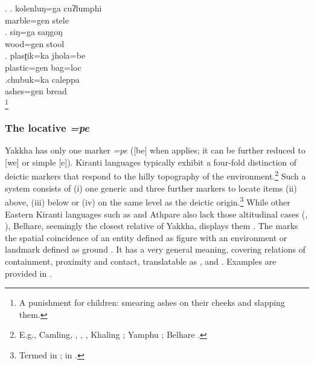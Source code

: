 \ex. \ag. kolenluŋ=ga   cuʔlumphi\\
	marble{\sc =gen} stele\\
	 
 	\bg. siŋ=ga    saŋgoŋ\\
	wood{\sc =gen} stool	\\
\bg. plasʈik=ka    jhola=be\\
plastic{\sc =gen} bag{\sc =loc}\\
	 
	  \bg.chubuk=ka caleppa\\
	  ashes{\sc =gen} bread\\
	  \footnote{A punishment for children: smearing ashes on their cheeks and slapping them.}   


\subsubsection{The locative \emph{=pe}}\label{case-loc}

Yakkha has only one   marker \emph{=pe} ([be] when  applies; it can be further reduced to [we] or simple [e]). Kiranti languages typically exhibit a four-fold distinction of deictic   markers that respond to the hilly topography of the environment.\footnote{E.g., Camling, , , , Khaling \citep{Ebert1994The-structure}; Yamphu \citep[72]{Rutgers1998Yamphu}; Belhare \citep[226]{Bickel2001Deictic}.} Such a  system consists of (i) one generic  and three further markers to locate items (ii) above, (iii) below or (iv) on the same level as the deictic origin.\footnote{Termed  in \citet[94]{Ebert1994The-structure};  in \citet[62]{Dirksmeyer2008Spatial}.} While other Eastern Kiranti languages such as  and Athpare also lack those altitudinal cases (\citealt[118]{Ebert1997A-grammar}, \citealt[49]{Driem1987A-grammar}), Belhare, seemingly the closest relative of Yakkha, displays them \citep[226]{Bickel2001Deictic}. 
The  marks the spatial coincidence of an entity defined as {\sc figure} with an environment or landmark defined as {\sc ground}  \citep[3]{Levinsonetal2006_Grammars}.  It has a very general meaning, covering relations of containment, proximity and contact, translatable as ,  and . Examples are provided in \Next. 

